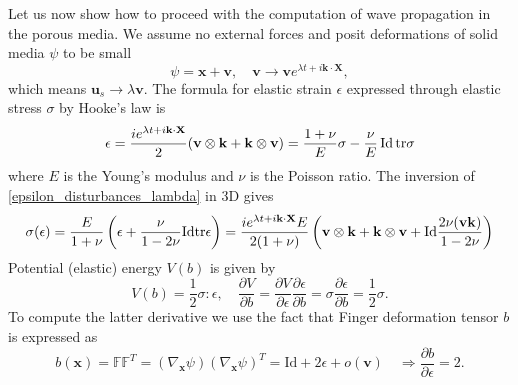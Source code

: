 \documentclass[12pt]{article}
\numberwithin{theorem}{section}
\begin{document}
Let us now show how to proceed with the computation of wave propagation in the porous media. We assume no external forces and posit deformations of solid media $\psi$ to be small
\begin{equation}{\psi} = \mathbf{x}+\mathbf{v}, \quad \mathbf{v} \rightarrow \mathbf{v}e^{\lambda t + i\mathbf{k\cdot X}},\end{equation} which means $\mathbf{u}_s \rightarrow \lambda \mathbf{v}.$
The formula for elastic strain $\epsilon$ expressed through elastic stress $\sigma$ by Hooke's law is
\begin{equation} 
\epsilon =\frac{ie^{\lambda t + i\mathbf{k\cdot X}}}{2}(\mathbf{v\otimes k + k\otimes v})= \frac{1+\nu}{E}\sigma - \frac{\nu}{E} \,  {\rm Id} \,  {\rm tr} \sigma
\label{epsilon_disturbances_lambda}
\end{equation}
where $E$ is the Young's modulus and $\nu$ is the Poisson ratio. The inversion of \eqref{epsilon_disturbances_lambda} in 3D gives 
\begin{equation} 
\sigma(\epsilon) = \frac{E}{1+\nu}\left(\epsilon + \frac{\nu}{1-2\nu} {\rm Id} {\rm tr} \epsilon \right) = 
 \frac{ie^{\lambda t + i\mathbf{k\cdot X}}E}{2(1+\nu)}\left(\mathbf{v\otimes k + k\otimes v} + {\rm Id}\frac{2\nu( \mathbf{vk})}{1-2\nu} \right)
 \label{sigma_dist_lambda} 
\end{equation} 
Potential (elastic) energy $V(b)$ is given by
\begin{equation}V(b) = \frac12 \sigma:\epsilon, \quad \frac{\partial V}{\partial b} = \frac{\partial V}{\partial \epsilon}\frac{\partial \epsilon}{\partial b} = \sigma\frac{\partial \epsilon}{\partial b}=\frac12{\sigma}.\end{equation} To compute the latter derivative we use the fact that Finger deformation tensor $b$ is expressed as
\begin{equation}b(\mathbf{x}) = \mathbb{FF}^T = (\nabla_\mathbf{x} \psi)(\nabla_\mathbf{x} \psi)^T = \mathrm{Id} + 2\epsilon + o(\mathbf{v}) \quad\Rightarrow \frac{\partial b}{\partial \epsilon } = 2.\end{equation}
\end{document}
